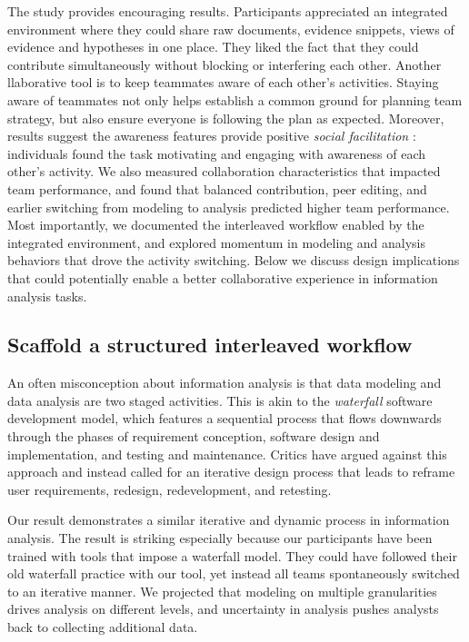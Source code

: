 The study provides encouraging results. Participants appreciated an integrated
environment where they could share raw documents, evidence snippets, views of
evidence and hypotheses in one place. They liked the fact that they could
contribute simultaneously without blocking or interfering each other. Another
llaborative tool is to keep teammates aware of each other's
activities. Staying aware of teammates not only helps establish a common ground
for planning team strategy, but also ensure everyone is following the plan as
expected. Moreover, results suggest the awareness features provide positive
\emph{social facilitation} \citep{Zajonc1965}: individuals found the task
motivating and engaging with awareness of each other's activity. We also
measured collaboration characteristics that impacted team performance, and found
that balanced contribution, peer editing, and earlier switching from modeling to
analysis predicted higher team performance. Most importantly, we documented the
interleaved workflow enabled by the integrated environment, and explored
momentum in modeling and analysis behaviors that drove the activity switching.
Below we discuss design implications that could potentially enable a better
collaborative experience in information analysis tasks.

\subsection{Scaffold a structured interleaved workflow}

An often misconception about information analysis is that data modeling and
data analysis are two staged activities. This is akin to the \emph{waterfall}
software development model, which features a sequential process that
flows downwards through the phases of requirement conception, software
design and implementation, and testing and maintenance. Critics have
argued against this approach and instead called for an iterative design
process that leads to reframe user requirements,
redesign, redevelopment, and retesting.

Our result demonstrates a similar iterative and dynamic process in information
analysis. The result is striking especially because our participants have been
trained with tools that impose a waterfall model. They could have followed their
old waterfall practice with our tool, yet instead all teams spontaneously
switched to an iterative manner. We projected that modeling on multiple granularities drives analysis on different levels, and uncertainty in analysis pushes analysts back to collecting additional data.

